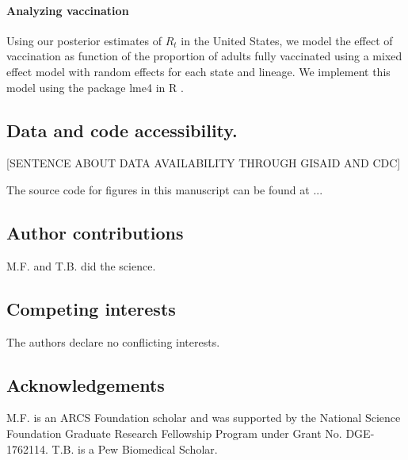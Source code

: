 \documentclass[12pt]{article}
\begin{document}
\paragraph{Analyzing vaccination}

Using our posterior estimates of $R_{t}$ in the United States, we model the effect of vaccination as function of the proportion of adults fully vaccinated using a mixed effect model with random effects for each state and lineage. We implement this model using the package lme4 in R \cites{Bates2015, RLang2017}.


\subsection*{Data and code accessibility.}

[SENTENCE ABOUT DATA AVAILABILITY THROUGH GISAID AND CDC]

The source code for figures in this manuscript can be found at ...

\subsection*{Author contributions}

M.F. and T.B. did the science.

\subsection*{Competing interests}%

The authors declare no conflicting interests.

\subsection*{Acknowledgements}%

M.F. is an ARCS Foundation scholar and was supported by the National Science Foundation Graduate Research Fellowship Program under Grant No. DGE-1762114.
T.B. is a Pew Biomedical Scholar.
\end{document}
